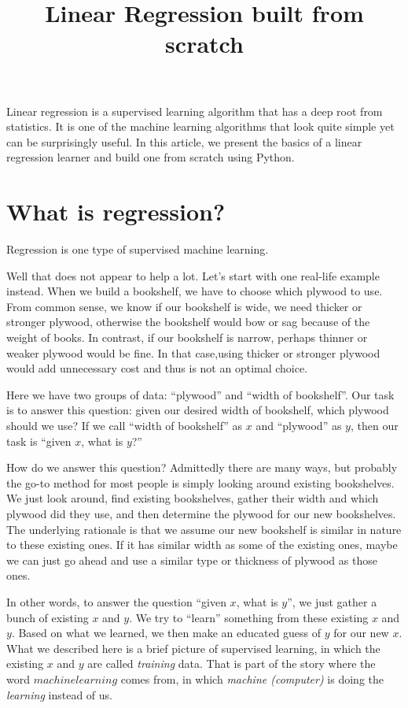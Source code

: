 \documentclass[
	letterpaper
]{article}
\title{Linear Regression built from scratch}
\date{}
\begin{document}
\maketitle
Linear regression is a supervised learning algorithm that has a deep root from statistics. 
It is one of the machine learning algorithms that look quite simple yet can be surprisingly useful.
In this article, we present the basics of a linear regression learner and build one from scratch using Python.

\section{What is regression?}
Regression is one type of supervised machine learning.

Well that does not appear to help a lot.
Let's start with one real-life example instead.
When we build a bookshelf, we have to choose which plywood to use.
From common sense, we know if our bookshelf is wide, we need thicker or stronger plywood, otherwise the bookshelf would bow or sag because of the weight of books.
In contrast, if our bookshelf is narrow, perhaps thinner or weaker plywood would be fine.
In that case,using thicker or stronger plywood would add unnecessary cost and thus is not an optimal choice.

Here we have two groups of data: ``plywood'' and ``width of bookshelf''.
Our task is to answer this question: given our desired width of bookshelf, which plywood should we use?
If we call ``width of bookshelf'' as $x$ and ``plywood'' as $y$, then our task is ``given $x$, what is $y$?''

How do we answer this question? 
Admittedly there are many ways, but probably the go-to method for most people is simply looking around existing bookshelves.
We just look around, find existing bookshelves, gather their width and which plywood did they use, and then determine the plywood for our new bookshelves.
The underlying rationale is that we assume our new bookshelf is similar in nature to these existing ones. 
If it has similar width as some of the existing ones, maybe we can just go ahead and use a similar type or thickness of plywood as those ones.

In other words, to answer the question ``given $x$, what is $y$'', we just gather a bunch of existing $x$ and $y$.
We try to ``learn'' something from these existing $x$ and $y$.
Based on what we learned, we then make an educated guess of $y$ for our new $x$.
What we described here is a brief picture of supervised learning, in which the existing $x$ and $y$ are called \textit{training} data.
That is part of the story where the word $machine learning$ comes from, in which \textit{machine (computer)} is doing the \textit{learning} instead of us.
\end{document}

